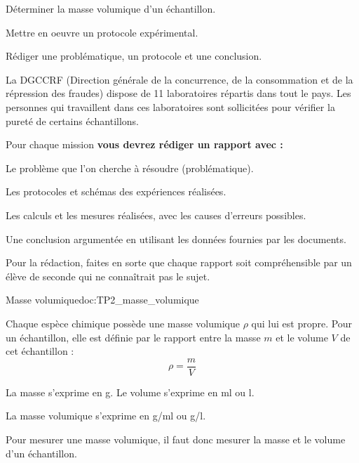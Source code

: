 \teteSndCorp




\begin{objectifs}
  \item Déterminer la masse volumique d'un échantillon.
  \item Mettre en oeuvre un protocole expérimental.
  \item Rédiger une problématique, un protocole et une conclusion.
\end{objectifs}


\begin{contexte}
  La \textsf{DGCCRF} (Direction générale de la concurrence, de la consommation et de la répression des fraudes) dispose de 11 laboratoires répartis dans tout le pays. 
  Les personnes qui travaillent dans ces laboratoires sont sollicitées pour vérifier la pureté de certains échantillons.
\end{contexte}


Pour chaque mission \textbf{vous devrez rédiger un rapport avec :}
\begin{listePoints}
  \item Le problème que l'on cherche à résoudre (problématique).
  \item Les protocoles et schémas des expériences réalisées.
  \item Les calculs et les mesures réalisées, avec les causes d'erreurs possibles.
  \item Une conclusion argumentée en utilisant les données fournies par les documents.
\end{listePoints}

\flecheLongue Pour la rédaction, faites en sorte que chaque rapport soit compréhensible par un élève de seconde qui ne connaîtrait pas le sujet.


\begin{doc}{Masse volumique}{doc:TP2_masse_volumique}
  \begin{encart}
    Chaque espèce chimique possède une masse volumique $\rho$ qui lui est propre.
    Pour un échantillon, elle est définie par le rapport entre la masse $m$ et le volume $V$ de cet échantillon : 
    \begin{equation*}
      \rho = \dfrac{m}{V}
    \end{equation*}
  \end{encart}
  
  \begin{listePoints}
    \item La masse s'exprime en \unit{\g}.
    Le volume s'exprime en \unit{\ml} ou \unit{\litre}.
    \item La masse volumique s'exprime en \unit{\g/\ml} ou \unit{\g/\litre}.
  \end{listePoints}
  Pour mesurer une masse volumique, il faut donc mesurer la masse et le volume d'un échantillon.
\end{doc}

